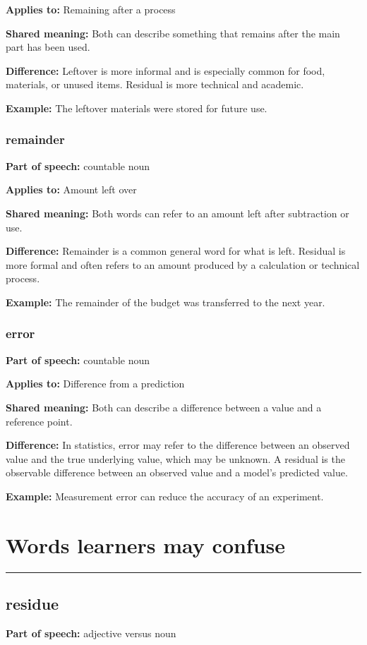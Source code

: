 \documentclass[11pt]{article}
\newcommand{\sectionrule}{\par\vspace{-0.5em}\noindent\textcolor{Accent}{\rule{\linewidth}{0.6pt}}\par}
\begin{document}
\textbf{Applies to:} Remaining after a process

\textbf{Shared meaning:} Both can describe something that remains after the main part has been used.

\textbf{Difference:} Leftover is more informal and is especially common for food, materials, or unused items. Residual is more technical and academic.

\textbf{Example:} The leftover materials were stored for future use.

\subsubsection{remainder}
\textbf{Part of speech:} countable noun

\textbf{Applies to:} Amount left over

\textbf{Shared meaning:} Both words can refer to an amount left after subtraction or use.

\textbf{Difference:} Remainder is a common general word for what is left. Residual is more formal and often refers to an amount produced by a calculation or technical process.

\textbf{Example:} The remainder of the budget was transferred to the next year.

\subsubsection{error}
\textbf{Part of speech:} countable noun

\textbf{Applies to:} Difference from a prediction

\textbf{Shared meaning:} Both can describe a difference between a value and a reference point.

\textbf{Difference:} In statistics, error may refer to the difference between an observed value and the true underlying value, which may be unknown. A residual is the observable difference between an observed value and a model's predicted value.

\textbf{Example:} Measurement error can reduce the accuracy of an experiment.

\section{Words learners may confuse}
\sectionrule
\subsection{residue}
\textbf{Part of speech:} adjective versus noun
\end{document}
